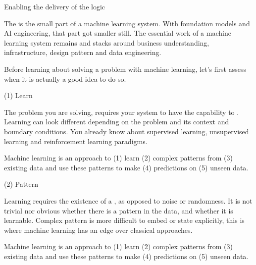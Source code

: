 \begin{frame}{Enabling the delivery of the logic}
  \begin{withmargin}
    \begin{tdmain}
      The  is the small part of a machine learning system. 
      With foundation models and AI engineering, that part got smaller still. 
      The essential work of a machine learning system remains and stacks around business understanding, infrastructure, design pattern and data engineering.
    \end{tdmain}
    \begin{tdmargin}
      Before learning about solving a problem with machine learning, let's first assess when it is actually a good idea to do so.  
    \end{tdmargin}
  \end{withmargin}
\end{frame}

\begin{frame}{(1) Learn}
  \begin{withmargin}
    \begin{tdmain}
        The problem you are solving, requires your system to have the capability to .
        Learning can look different depending on the problem and its context and boundary conditions.
        You already know about supervised learning, unsupervised learning and reinforcement learning paradigms.
    \end{tdmain}
    \begin{tdmargin}
        Machine learning is an approach to (1) learn (2) complex patterns
        from (3) existing data and use these patterns to make (4)
        predictions on (5) unseen data.
    \end{tdmargin}
  \end{withmargin}
\end{frame}

\begin{frame}{(2) Pattern}
    \begin{withmargin}
      \begin{tdmain}
          Learning requires the existence of a , as opposed to noise or randomness. 
          It is not trivial nor obvious whether there is a pattern in the data, and whether it is learnable.
          Complex pattern is more difficult to embed or state explicitly, this is where machine learning has an edge over classical approaches.
      \end{tdmain}
      \begin{tdmargin}
          Machine learning is an approach to (1) learn (2) complex patterns
          from (3) existing data and use these patterns to make (4)
          predictions on (5) unseen data.
      \end{tdmargin}
    \end{withmargin}
  \end{frame}


